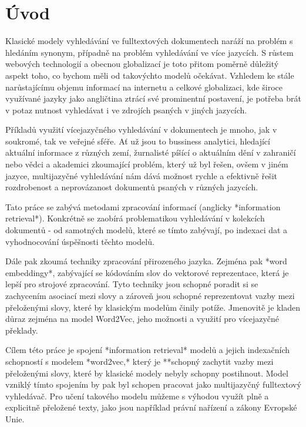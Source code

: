 \chapter{Úvod}
\setcounter{page}{1}

Klasické modely vyhledávání ve fulltextových dokumentech naráží na problém s hledáním synonym, případně na problém vyhledávání ve více jazycích. S růstem webových technologií a obecnou globalizací je toto přitom poměrně důležitý aspekt toho, co bychom měli od takovýchto modelů očekávat. Vzhledem ke stále narůstajícímu objemu informací na internetu a celkové globalizaci, kde široce využívané jazyky jako angličtina ztrácí své prominentní postavení, je potřeba brát v potaz nutnost vyhledávat i ve zdrojích psaných v jiných jazycích.

Příkladů využití vícejazyčného vyhledávání v dokumentech je mnoho, jak v soukromé, tak ve veřejné sféře. Ať už jsou to bussiness analytici, hledající aktuální informace z různých zemí, žurnalisté píšící o aktuálním dění v zahraničí nebo vědci a akademici zkoumající problém, který už byl řešen, ovšem v jiném jazyce, multijazyčné vyhledávání nám dává možnost rychle a efektivně řešit rozdrobenost a neprovázanost dokumentů psaných v různých jazycích.

Tato práce se zabývá metodami zpracování informací (anglicky *information retrieval*). Konkrétně se zaobírá problematikou vyhledávání v kolekcích dokumentů - od samotných modelů, které se tímto zabývají, po indexaci dat a vyhodnocování úspěšnosti těchto modelů.

Dále pak zkoumá techniky zpracování přirozeného jazyka. Zejména pak *word embeddingy*, zabývající se kódováním slov do vektorové reprezentace, která je lepší pro strojové zpracování. Tyto techniky jsou schopné poradit si se zachycením asociací mezi slovy a zároveň jsou schopné reprezentovat vazby mezi přeloženými slovy, které by klasickým modelům činily potíže. Jmenovitě je kladen důraz zejména na model Word2Vec, jeho možnosti a využití pro vícejazyčné překlady.

Cílem této práce je spojení *information retrieval* modelů a jejich indexačních schopností s modelem *word2vec,* který je **schopný zachytit vazby mezi přeloženými slovy, které by klasické modely nebyly schopny postihnout. Model vzniklý tímto spojením by pak byl schopen pracovat jako multijazyčný fulltextový vyhledávač. Pro učení takového modelu můžeme s výhodou využít plně a explicitně přeložené texty, jako jsou například právní nařízení a zákony Evropské Unie.
